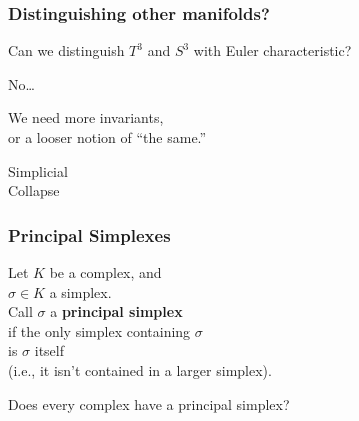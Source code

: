 \documentclass[14pt]{beamer}
\newcommand{\setbackgroundpicture}[1]{%
\usebackgroundtemplate{
\begin{pgfpicture}{0in}{0in}{\paperwidth}{\paperheight}
\pgfputat{\pgfxy(0,0)}{\texttt{[image: \#1]}}
\color{white}
\pgfsetfillopacity{0.8}
\pgfrect[fill]{\pgfxy(0,0)}{\pgfpoint{\paperwidth}{\paperheight}}
\end{pgfpicture}
}
}
\newcommand{\clearbackgroundpicture}{\usebackgroundtemplate{}}
\begin{document}
\begin{frame}
  \frametitle{Distinguishing other manifolds?}

  Can we distinguish $T^3$ and $S^3$ with Euler characteristic?

  \vfill
  \pause

  No\pause\ldots

  \vfill

  We need more invariants, \\
  \pause
  or a looser notion of ``the same.''
  
\end{frame}


% 


\setbackgroundpicture{collapsedbarn.jpg}
\begin{frame}
  \vfill
  \begin{center}
    \Huge Simplicial \\
    Collapse
  \end{center}
  \vfill
\end{frame}
\clearbackgroundpicture

\begin{frame}
  \frametitle{Principal Simplexes}

  \begin{definition}
  Let $K$ be a complex, and \\
  $\sigma \in K$ a simplex.  \\
  Call $\sigma$ a \textbf{principal simplex} \\
  if the only simplex containing $\sigma$ \\
  is $\sigma$ itself \\
  \quad (i.e., it isn't contained in a larger simplex).
  \end{definition} 

  \pause
  \begin{problem}
  Does every complex have a principal simplex?
  \end{problem}

\end{frame}
\end{document}
